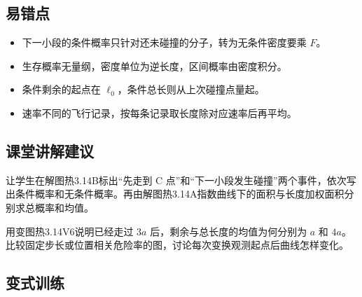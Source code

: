 \documentclass[UTF8,fontset=fandol,a4paper,11pt]{ctexart}
\begin{document}


\subsection*{易错点}

\begin{itemize}
\item 下一小段的条件概率只针对还未碰撞的分子，转为无条件密度要乘 $F$。
\item 生存概率无量纲，密度单位为逆长度，区间概率由密度积分。
\item 条件剩余的起点在 $\ell_0$，条件总长则从上次碰撞点量起。
\item 速率不同的飞行记录，按每条记录取长度除对应速率后再平均。
\end{itemize}



\subsection*{课堂讲解建议}

让学生在解图热3.14B标出“先走到 C 点”和“下一小段发生碰撞”两个事件，依次写出条件概率和无条件概率。再由解图热3.14A指数曲线下的面积与长度加权面积分别求总概率和均值。

用变图热3.14V6说明已经走过 $3a$ 后，剩余与总长度的均值为何分别为 $a$ 和 $4a$。比较固定步长或位置相关危险率的图，讨论每次变换观测起点后曲线怎样变化。



\subsection*{变式训练}
\end{document}
